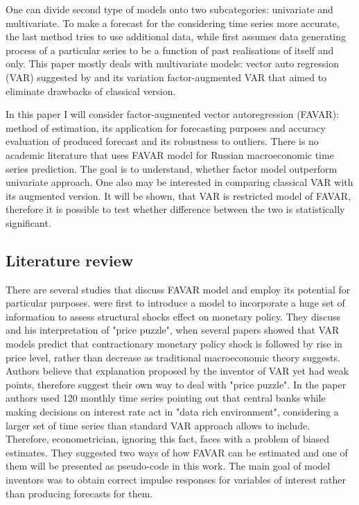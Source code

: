 \documentclass[a4paper, 14pt]{article}
\begin{document}
One can divide second type of models onto two subcategories: univariate and multivariate. To make a forecast for the considering time series more accurate, the last method tries to use additional data, while first assumes data generating process of a particular series to be a function of past realisations of itself and only. This paper mostly deals with multivariate models: vector auto regression (VAR) suggested by \cite{sims1980martingale} and its variation factor-augmented VAR that aimed to eliminate drawbacks of classical version.  

In this paper I will consider factor-augmented vector autoregression (FAVAR): method of estimation, its application for forecasting purposes and accuracy evaluation of produced forecast and its robustness to outliers. There is no academic literature that uses FAVAR model for Russian macroeconomic time series prediction. The goal is to understand, whether factor model outperform univariate approach. One also may be interested in comparing classical VAR with its augmented version. It will be shown, that VAR is restricted model of FAVAR, therefore it is possible to test whether difference between the two is statistically significant. 
 
\subsection{Literature review}
There are several studies that discuss FAVAR model and employ its potential for particular purposes. \cite{bernanke2005measuring} were first to introduce a model to incorporate a huge set of information to assess structural shocks effect on monetary policy. They discuss \cite{sims1992interpreting} and his interpretation of "price puzzle", when several papers showed that VAR models predict that contractionary monetary policy shock is followed by rise in price level, rather than decrease as traditional macroeconomic theory suggests. Authors believe that explanation proposed by the inventor of VAR yet had weak points, therefore suggest their own way to deal with "price puzzle". In the paper authors used 120 monthly time series pointing out that central banks while making decisions on interest rate act in "data rich environment", considering a larger set of time series than standard VAR approach allows to include. Therefore, econometrician, ignoring this fact, faces with a problem of biased estimates. They suggested two ways of how FAVAR can be estimated and one of them will be presented as pseudo-code in this work. The main goal of model inventors was to obtain correct impulse responses for variables of interest rather than producing forecasts for them. 
\end{document}
